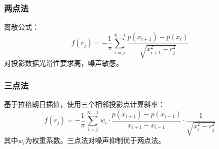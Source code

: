 	\subsubsection{两点法}
	离散公式：
	\begin{equation}
		f(r_j)=-\frac{1}{\pi}\sum_{i=j}^{N-1}\frac{p(x_{i+1})-p(x_i)}{\sqrt{x_{i+1}^2-r_j^2}}
		\label{eq:twopoint}
	\end{equation}
	对投影数据光滑性要求高，噪声敏感。
	\subsubsection{三点法}
	基于拉格朗日插值，使用三个相邻投影点计算斜率：
	\begin{equation}
		f(r_j)=-\frac{1}{\pi}\sum_{i=j}^{N-1}w_i\cdot\frac{p(x_{i+1})-p(x_{i-1})}{x_{i+1}-x_{i-1}}\cdot\frac{1}{\sqrt{x_i^2-r_j^2}}
		\label{eq:threepoint}
	\end{equation}
	其中$w_i$为权重系数。三点法对噪声抑制优于两点法。
